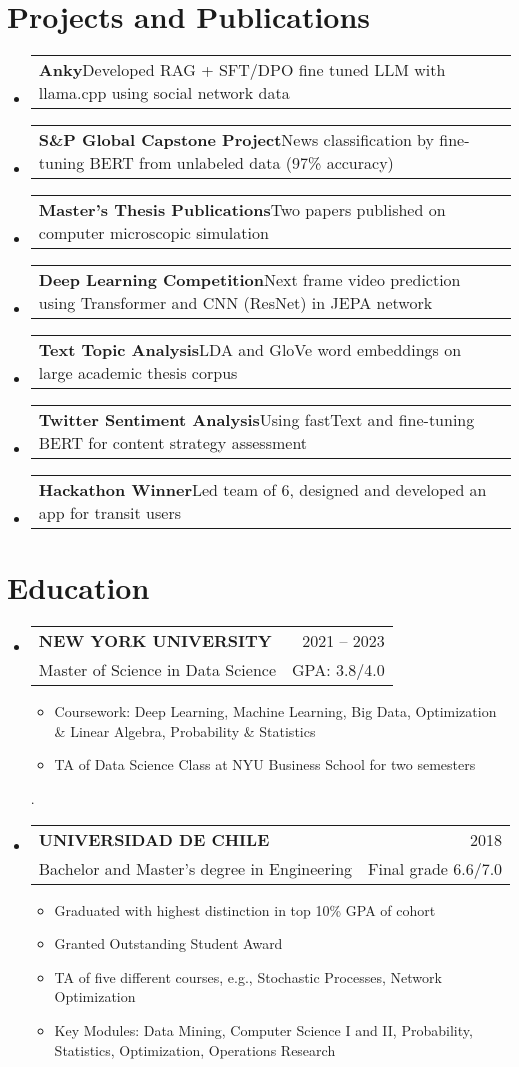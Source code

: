 \documentclass[a4paper,11pt]{article}
\makeatletter
\newcommand{\resumePOR}[3]{
\vspace{0.5mm}\item
    \begin{tabular*}{0.97\textwidth}[t]{l@{\extracolsep{\fill}}r}
        \textbf{#1}\hspace{0.3mm}#2 & \textit{\small{#3}} 
    \end{tabular*}
    \vspace{-2mm}
}
\newcommand{\resumeSubheading}[4]{
\vspace{0.5mm}\item
    \begin{tabular*}{0.98\textwidth}[t]{l@{\extracolsep{\fill}}r}
        \textbf{#1} & {\footnotesize{#4}} \\
        {{#2}} &  \footnotesize{#3}\\
    \end{tabular*}
    \vspace{-2.4mm}
}
\newcommand{\resumeSubHeadingListStart}{\begin{itemize}[leftmargin=*,labelsep=0mm]}
\newcommand{\resumeItemListStart}{\begin{justify}\begin{itemize}[leftmargin=3ex, rightmargin=2ex, noitemsep,labelsep=1.2mm,itemsep=0mm]\small}
\newcommand{\resumeSubHeadingListEnd}{\end{itemize}\vspace{2mm}}
\newcommand{\resumeItemListEnd}{\end{itemize}\end{justify}\vspace{-2mm}}
\makeatother
\begin{document}
\section{\textbf{Projects and Publications}}
\resumeSubHeadingListStart
  \resumePOR{Anky}{Developed RAG + SFT/DPO fine tuned LLM with llama.cpp using social network data }{}
  \resumePOR{S\&P Global Capstone Project}{News classification by fine-tuning BERT from unlabeled data (97\% accuracy)}{}
  \resumePOR{Master's Thesis Publications}{Two papers published on computer microscopic simulation}{}
  \resumePOR{Deep Learning Competition}{Next frame video prediction using Transformer and CNN (ResNet) in JEPA network}{}
  \resumePOR{Text Topic Analysis}{LDA and GloVe word embeddings on large academic thesis corpus}{}
  \resumePOR{Twitter Sentiment Analysis}{Using fastText and fine-tuning BERT for content strategy assessment}{}
  \resumePOR{Hackathon Winner}{Led team of 6, designed and developed an app for transit users}{}
\resumeSubHeadingListEnd

\vspace{-0.2cm} %

\section{\textbf{Education}}
  \resumeSubHeadingListStart
    \resumeSubheading
      {NEW YORK UNIVERSITY}{Master of Science in Data Science}
      {GPA: 3.8/4.0}{2021 – 2023}
      \resumeItemListStart
        \item {Coursework: Deep Learning, Machine Learning, Big Data, Optimization \& Linear Algebra, Probability \& Statistics}
        \item {TA of Data Science Class at NYU Business School for two semesters}
      \resumeItemListEnd
      
\clearpage
. \vspace{0.4cm}
    \resumeSubheading
      {UNIVERSIDAD DE CHILE}{Bachelor and Master's degree in Engineering}
      {Final grade 6.6/7.0}{2018}
      \resumeItemListStart
        \item {Graduated with highest distinction in top 10\% GPA of cohort}
        \item {Granted Outstanding Student Award}
        \item {TA of five different courses, e.g., Stochastic Processes, Network Optimization}
        \item {Key Modules: Data Mining, Computer Science I and II, Probability, Statistics, Optimization, Operations Research}
      \resumeItemListEnd
\resumeSubHeadingListEnd
\end{document}
